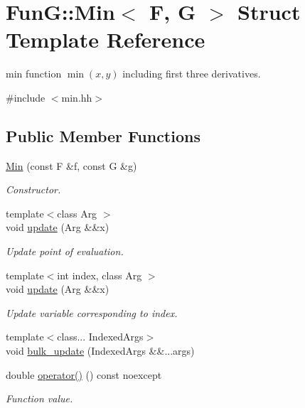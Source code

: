 \hypertarget{structFunG_1_1Min}{}\section{FunG\+:\+:Min$<$ F, G $>$ Struct Template Reference}
\label{structFunG_1_1Min}


min function $ \min(x,y) $ including first three derivatives.  




{\ttfamily \#include $<$min.\+hh$>$}

\subsection*{Public Member Functions}
\begin{DoxyCompactItemize}
\item 
\hyperlink{structFunG_1_1Min_afc46c17a7dfe4c0059c961d26c04ecaa}{Min} (const F \&f, const G \&g)
\begin{DoxyCompactList}\small\item\em Constructor. \end{DoxyCompactList}\item 
{\footnotesize template$<$class Arg $>$ }\\void \hyperlink{structFunG_1_1Min_a09c10a89b4f6c8129e08273f2048b352}{update} (Arg \&\&x)
\begin{DoxyCompactList}\small\item\em Update point of evaluation. \end{DoxyCompactList}\item 
{\footnotesize template$<$int index, class Arg $>$ }\\void \hyperlink{structFunG_1_1Min_a5d575265b40cefd19618662a0c79ffbd}{update} (Arg \&\&x)
\begin{DoxyCompactList}\small\item\em Update variable corresponding to index. \end{DoxyCompactList}\item 
{\footnotesize template$<$class... Indexed\+Args$>$ }\\void \hyperlink{structFunG_1_1Min_a350e4808181eba93cbd1d964e5d45932}{bulk\+\_\+update} (Indexed\+Args \&\&...args)
\item 
double \hyperlink{structFunG_1_1Min_a7877e2f07798225fc3979d6414e882a5}{operator()} () const noexcept
\begin{DoxyCompactList}\small\item\em Function value. \end{DoxyCompactList}\item 

\end{DoxyCompactItemize}
